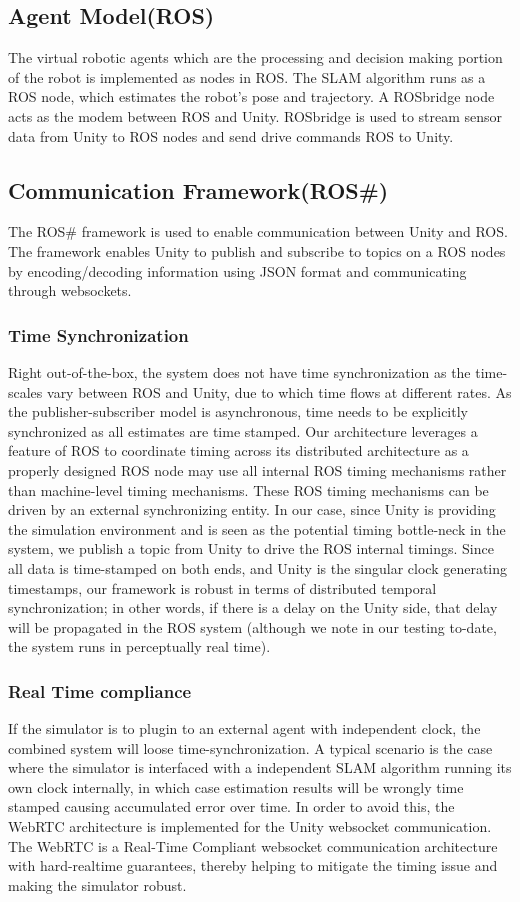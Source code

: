 \documentclass[a4paper, 10pt, conference]{ieeeconf}      %
\begin{document}
\subsection{Agent Model(ROS)}
The virtual robotic agents which are the processing and decision making portion of the robot is implemented as nodes in ROS. The SLAM algorithm runs as a ROS node, which estimates the robot's pose and trajectory. A ROSbridge node\cite{crick2017rosbridge} acts as the modem between ROS and Unity. ROSbridge is used to stream sensor data from Unity  to ROS nodes  and send drive commands ROS to Unity.  
\subsection{Communication Framework(ROS\#)}
The ROS\# framework is used to enable communication between Unity and ROS. The framework enables Unity to publish and subscribe to topics on  a ROS nodes by encoding/decoding information using JSON format and communicating through websockets. 
\subsubsection{Time Synchronization}
Right  out-of-the-box, the system does not have time synchronization as the time-scales vary between ROS and Unity, due to which time flows at different rates. As the publisher-subscriber model is asynchronous, time needs to be explicitly synchronized as all estimates are time stamped. Our architecture leverages a feature of ROS to coordinate timing across its distributed architecture as a properly designed ROS node may use all internal ROS timing mechanisms rather than machine-level timing mechanisms. These ROS timing mechanisms can be driven by an external synchronizing entity. In our case, since Unity is providing the simulation environment and is seen as the potential timing bottle-neck in the system, we publish a topic from Unity to drive the ROS internal timings. Since all data is time-stamped on both ends, and Unity is the singular clock generating timestamps, our framework is robust in terms of distributed temporal synchronization; in other words, if there is a delay on the Unity side, that delay will be propagated in the ROS system (although we note in our testing to-date, the system runs in perceptually real time).
\subsubsection{Real Time compliance}
If the simulator is to plugin to an external agent with independent clock, the combined system will loose time-synchronization. A typical scenario is the case where the simulator is interfaced with a independent SLAM algorithm running its own clock internally, in which case estimation results will be wrongly time stamped causing accumulated error over time. In order to avoid this, the WebRTC architecture\cite{loreto2014real} is implemented for the Unity websocket communication. The WebRTC is a Real-Time Compliant websocket communication architecture with hard-realtime guarantees, thereby helping to mitigate the timing issue  and making the simulator robust. 
\end{document}
